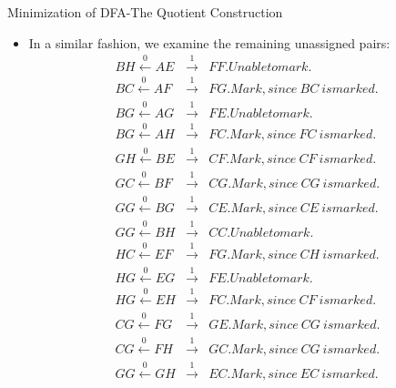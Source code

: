 \documentclass{beamer}
\begin{document}
\begin{frame}{Minimization of DFA-The Quotient Construction}
	\small
	\begin{itemize}
		\item In a similar fashion, we examine the remaining unassigned pairs:
			\tiny
\begin{eqnarray*}
	BH \xleftarrow{0} AE &\xrightarrow{1}& F F. Unable to mark.\\
	BC \xleftarrow{0} AF &\xrightarrow{1}& F G. Mark, since \ BC\  is marked.\\
	BG \xleftarrow{0} AG &\xrightarrow{1}& F E. Unable to mark.\\
	BG \xleftarrow{0} AH &\xrightarrow{1}& F C. Mark, since \ FC\  is marked.\\
	GH \xleftarrow{0} BE &\xrightarrow{1}& CF. Mark, since \ CF\  is marked.\\
	GC \xleftarrow{0} BF &\xrightarrow{1}& CG. Mark, since \ CG\  is marked.\\
	GG \xleftarrow{0} BG &\xrightarrow{1}& CE. Mark, since \ CE\  is marked.\\
	GG \xleftarrow{0} BH &\xrightarrow{1}& CC. Unable to mark.\\
	HC \xleftarrow{0} EF &\xrightarrow{1}& F G. Mark, since \ CH\  is marked.\\
	HG \xleftarrow{0} EG &\xrightarrow{1}& F E. Unable to mark.\\
	HG \xleftarrow{0} EH &\xrightarrow{1}& F C. Mark, since \ CF\  is marked.\\
	CG \xleftarrow{0} FG &\xrightarrow{1}& GE. Mark, since \ CG\  is marked.\\
	CG \xleftarrow{0} FH &\xrightarrow{1}& GC. Mark, since \ CG\  is marked.\\
	GG \xleftarrow{0} GH &\xrightarrow{1}& EC. Mark, since \ EC\  is marked.
\\
\end{eqnarray*}
	\end{itemize}
\end{frame}
\end{document}
